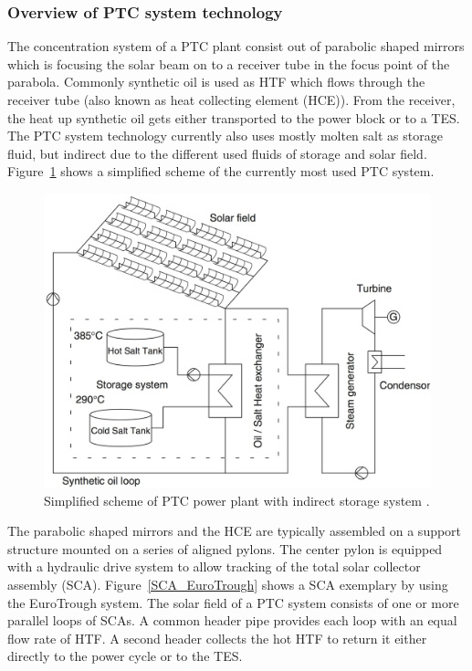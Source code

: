 \subsubsection{Overview of PTC system technology} 
The concentration system of a PTC plant consist out of parabolic shaped mirrors which is focusing the solar beam on to a receiver tube in the focus point of the parabola. Commonly synthetic oil is used as HTF which flows through the receiver tube (also known as heat collecting element (HCE)). From the receiver, the heat up synthetic oil gets either transported to the power block or to a TES. The PTC system technology currently also uses mostly molten salt as storage fluid, but indirect due to the different used fluids of storage and solar field. Figure~\ref{troughtindirecttwotank} shows a simplified scheme of the currently most used PTC system.

\begin{figure}[htbp]  
\centering
\includegraphics[width=0.65\linewidth]{FIG/troughtindirecttwotank}
\caption[Simplified scheme of PTC power plant with indirect storage system.]{Simplified scheme of PTC power plant with indirect storage system \cite{Steinmann2012}.}\label{troughtindirecttwotank}
\end{figure}
The parabolic shaped mirrors and the HCE are typically assembled on a support structure mounted on a series of aligned pylons. The center pylon is equipped with a hydraulic drive system to allow tracking of the total solar collector assembly (SCA). Figure~\ref{SCA_EuroTrough} shows a SCA exemplary by using the EuroTrough system. The solar field of a PTC system consists of one or more parallel loops of SCAs. A common header pipe provides each loop with an equal flow rate of HTF. A second header collects the hot HTF to return it either directly to the power cycle or to the TES. \cite{Lupfert2013,Maccari2015}

